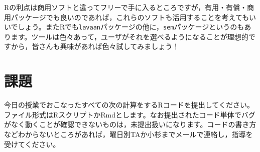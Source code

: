 \documentclass{ltjsbook}
\begin{document}
Rの利点は商用ソフトと違ってフリーで手に入るところですが，有用・有償・商用パッケージでも良いのであれば，これらのソフトも活用することを考えてもいいでしょう。またRでも\texttt{lavaan}パッケージの他に，\texttt{sem}パッケージというのもあります。ツールは色々あって，ユーザがそれを選べるようになることが理想的ですから，皆さんも興味があれば色々試してみましょう！

\section{課題}
今日の授業でおこなったすべての次の計算をするRコードを提出してください。ファイル形式はRスクリプトかRmdとします。なお提出されたコード単体でバグがなく動くことが確認できないものは，未提出扱いになります。コードの書き方などわからないところがあれば，曜日別TAか小杉までメールで連絡し，指導を受けてください。
\end{document}
